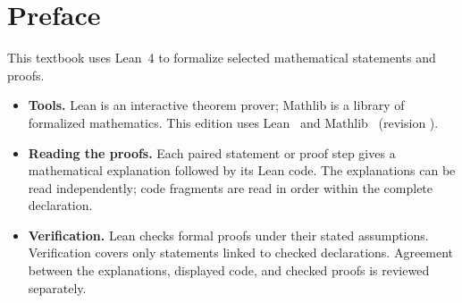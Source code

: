 \chapter{Preface}



This textbook uses Lean~4 to formalize selected mathematical statements and proofs.

\begin{itemize}
  \item \textbf{Tools.}
        Lean is an interactive theorem prover;
        Mathlib is a library of formalized mathematics.
        This edition uses Lean~\TextbookLeanVersion{} and
        Mathlib~\TextbookMathlibVersion{} (revision
        \href{https://github.com/leanprover-community/mathlib4/commit/\TextbookMathlibRevision}{\texttt{\TextbookMathlibShortRevision}}).
  \item \textbf{Reading the proofs.}
        Each paired statement or proof step gives a mathematical explanation
        followed by its Lean code.
        The explanations can be read independently;
        code fragments are read in order within the complete declaration.
  \item \textbf{Verification.}
        Lean checks formal proofs under their stated assumptions.
        Verification covers only statements linked to checked declarations.
        Agreement between the explanations, displayed code, and checked proofs
        is reviewed separately.
\end{itemize}
